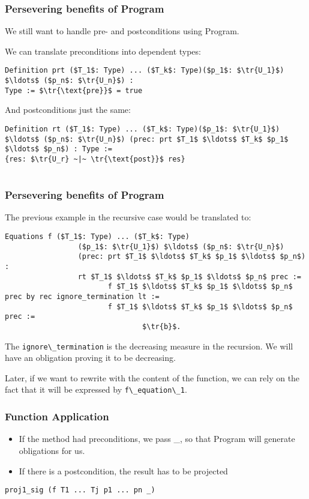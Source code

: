 \documentclass{beamer}
\newcommand{\tr}[1]{[#1]}
\newcommand{\coqInline}[1]{\lstinline[style=myCoqStyle]|#1|}
\begin{document}
\begin{frame}[fragile]
	\frametitle{Persevering benefits of Program}
	We still want to handle pre- and postconditions using Program.
	
	We can translate preconditions into dependent types:
	\begin{lstlisting}[style=myCoqstyle]  
Definition prt ($T_1$: Type) ... ($T_k$: Type)($p_1$: $\tr{U_1}$) $\ldots$ ($p_n$: $\tr{U_n}$) :
Type := $\tr{\text{pre}}$ = true
	\end{lstlisting}
	
	And postconditions just the same:
	\begin{lstlisting}[style=myCoqstyle] 
Definition rt ($T_1$: Type) ... ($T_k$: Type)($p_1$: $\tr{U_1}$) $\ldots$ ($p_n$: $\tr{U_n}$) (prec: prt $T_1$ $\ldots$ $T_k$ $p_1$ $\ldots$ $p_n$) : Type :=
{res: $\tr{U_r} ~|~ \tr{\text{post}}$ res}
	
	\end{lstlisting}
\end{frame}

\begin{frame}[fragile]
	\frametitle{Persevering benefits of Program}
	The previous example in the recursive case would be translated to:
	
	\begin{lstlisting}[style=myCoqstyle]
Equations f ($T_1$: Type) ... ($T_k$: Type)
			     ($p_1$: $\tr{U_1}$) $\ldots$ ($p_n$: $\tr{U_n}$) 
			     (prec: prt $T_1$ $\ldots$ $T_k$ $p_1$ $\ldots$ $p_n$) : 
			     rt $T_1$ $\ldots$ $T_k$ $p_1$ $\ldots$ $p_n$ prec :=
						f $T_1$ $\ldots$ $T_k$ $p_1$ $\ldots$ $p_n$ prec by rec ignore_termination lt :=
						f $T_1$ $\ldots$ $T_k$ $p_1$ $\ldots$ $p_n$ prec :=
								$\tr{b}$.
	\end{lstlisting}
	
	The \coqInline{ignore\_termination} is the decreasing measure in the recursion. We will have an obligation proving it to be decreasing.
	
	Later, if we want to rewrite with the content of the function, we can rely on the fact that it will be expressed by \coqInline{f\_equation\_1}.
	
\end{frame}


\begin{frame}[fragile]
	\frametitle{Function Application}
	\begin{itemize}
		\item If the method had preconditions, we pass \_, so that Program will generate obligations for us.
		\item If there is a postcondition, the result has to be projected
	\end{itemize}

\begin{lstlisting}[style=myCoqstyle]  
proj1_sig (f T1 ... Tj p1 ... pn _)
\end{lstlisting}

\end{frame}
\end{document}
